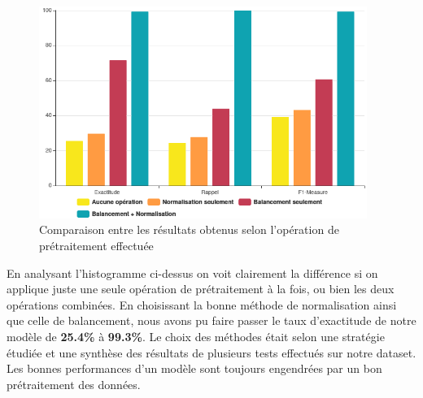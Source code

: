 \begin{figure}[h]
\centering
\includegraphics[width=0.95\textwidth]{Figures/performances}
\decoRule
\caption{Comparaison entre les résultats obtenus selon l'opération de prétraitement effectuée}
\label{fig:histogramme}
\end{figure} 
\newpage
En analysant l'histogramme ci-dessus on voit clairement la différence si on applique juste une seule opération de prétraitement à la fois, ou bien les deux opérations combinées. En choisissant la bonne méthode de normalisation ainsi que celle de balancement, nous avons pu faire passer le taux d'exactitude de notre modèle de \textbf{25.4\%} à \textbf{99.3\%}. Le choix des méthodes était selon une stratégie étudiée et une synthèse des résultats de plusieurs tests effectués sur notre dataset. Les bonnes performances d'un modèle sont toujours engendrées par un bon prétraitement des données.

\newpage
